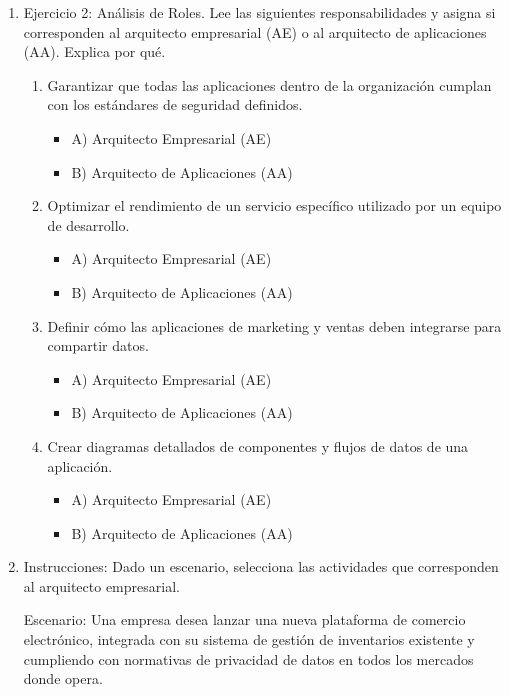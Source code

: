 \documentclass{article}
\begin{document}
\begin{enumerate}
    \item Ejercicio 2: Análisis de Roles. Lee las siguientes responsabilidades y asigna si corresponden al arquitecto empresarial (AE) o al arquitecto de aplicaciones (AA). Explica por qué.
    \begin{enumerate}
        \item Garantizar que todas las aplicaciones dentro de la organización cumplan con los estándares de seguridad definidos.
        \begin{itemize}
            \item A) Arquitecto Empresarial (AE)
            \item B) Arquitecto de Aplicaciones (AA)
        \end{itemize}
        \item Optimizar el rendimiento de un servicio específico utilizado por un equipo de desarrollo.
        \begin{itemize}
            \item A) Arquitecto Empresarial (AE)
            \item B) Arquitecto de Aplicaciones (AA)
        \end{itemize}
        \item Definir cómo las aplicaciones de marketing y ventas deben integrarse para compartir datos.
        \begin{itemize}
            \item A) Arquitecto Empresarial (AE)
            \item B) Arquitecto de Aplicaciones (AA)
        \end{itemize}
        \item Crear diagramas detallados de componentes y flujos de datos de una aplicación.
        \begin{itemize}
            \item A) Arquitecto Empresarial (AE)
            \item B) Arquitecto de Aplicaciones (AA)
        \end{itemize}
    \end{enumerate}

    \item Instrucciones: Dado un escenario, selecciona las actividades que corresponden al arquitecto empresarial.
    
    Escenario: Una empresa desea lanzar una nueva plataforma de comercio electrónico, integrada con su sistema de gestión de inventarios existente y cumpliendo con normativas de privacidad de datos en todos los mercados donde opera.
    

\end{enumerate}
\end{document}
